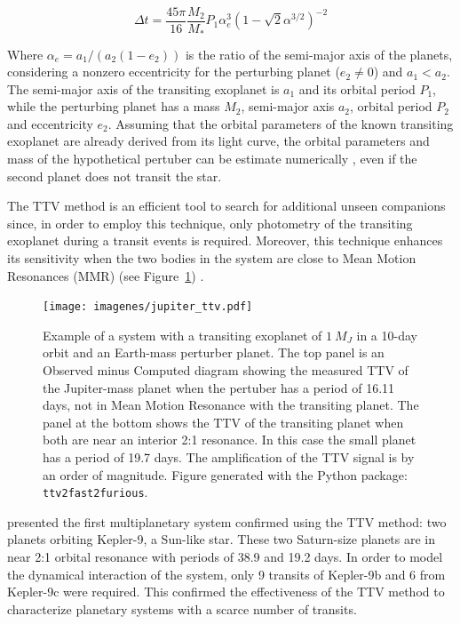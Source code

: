 \begin{equation}
\Delta t = \frac{45\pi}{16} \frac{M_2}{M_*} P_{1} \alpha^3_{e} (1-	\sqrt{2}\alpha^{3/2})^{-2}
\label{delta_t}
\end{equation}

Where $\alpha_e = a_1/(a_2(1-e_2))$ is the ratio of the semi-major axis of the planets, considering a nonzero eccentricity for the perturbing planet ($e_2 \neq 0$) and $a_1 < a_2$. The semi-major axis of the transiting exoplanet is $a_1$ and its orbital period $P_1$, while the perturbing planet has a mass $M_2$, semi-major axis $a_2$, orbital period $P_2$ and eccentricity $e_2$. Assuming that the orbital parameters of the known transiting exoplanet are already derived from its light curve, the orbital parameters and mass of the hypothetical pertuber can be estimate numerically \citep{Nesvorny2008,Nesvorny2009}, even if the second planet does not transit the star. 

The TTV method is an efficient tool to search for additional unseen companions since, in order to employ this technique, only photometry of the transiting exoplanet during a transit events is required. Moreover, this technique enhances its sensitivity when the two bodies in the system are close to Mean Motion Resonances (MMR) \citep{Agol2005,Steffen2005,Agol2007} (see Figure~\ref{rms_ttv_amplitude}) . 

\begin{figure}[ht]
\centering
\texttt{[image: imagenes/jupiter\_ttv.pdf]}
\caption{Example of a system with a transiting exoplanet of $1~M_{J}$ in a 10-day orbit and an Earth-mass perturber planet. The top panel is an Observed minus Computed diagram showing the measured TTV of the Jupiter-mass planet when the pertuber has a period of 16.11 days, not in Mean Motion Resonance with the transiting planet. The panel at the bottom shows the TTV of the transiting planet when both are near an interior 2:1 resonance. In this case the small planet has a period of 19.7 days. The amplification of the TTV signal is by an order of magnitude. Figure generated with the Python package: \texttt{ttv2fast2furious}.}
\label{rms_ttv_amplitude}
\end{figure}

\cite{Holman2010} presented the first multiplanetary system confirmed using the TTV method: two planets orbiting Kepler-9, a Sun-like star. These two Saturn-size planets are in near 2:1 orbital resonance with periods of 38.9 and 19.2 days. In order to model the dynamical interaction of the system, only 9 transits of Kepler-9b and 6 from Kepler-9c were required. This confirmed the effectiveness of the TTV method to characterize planetary systems with a scarce number of transits.

